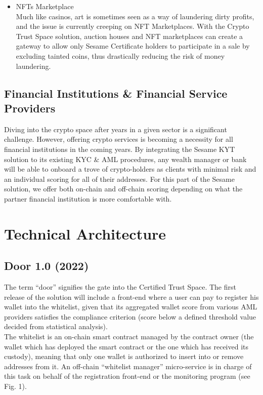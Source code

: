 ﻿\documentclass[a4paper]{article}
\newcommand{\smallvspace}{\vspace{4pt} \\}
\begin{document}
\begin{itemize}
\item 
NFTs Marketplace \smallvspace
Much like casinos, art is sometimes seen as a way of laundering dirty profits, and the issue is currently creeping on NFT Marketplaces. With the Crypto Trust Space solution, auction houses and NFT marketplaces can create a gateway to allow only Sesame Certificate holders to participate in a sale by excluding tainted coins, thus drastically reducing the risk of money laundering.
\end{itemize}

\subsection{Financial Institutions \& Financial Service Providers}
Diving into the crypto space after years in a given sector is a significant challenge. However, offering crypto services is becoming a necessity for all financial institutions in the coming years. By integrating the Sesame KYT solution to its existing KYC \& AML procedures, any wealth manager or bank will be able to onboard a trove of crypto-holders as clients with minimal risk and an individual scoring for all of their addresses. 
For this part of the Sesame solution, we offer both on-chain and off-chain scoring depending on what the partner financial institution is more comfortable with.

\newpage
\section{Technical Architecture}
\subsection{Door 1.0 (2022)}
The term “door” signifies the gate into the Certified Trust Space. The first release of the solution will include a front-end where a user can pay to register his wallet into the whitelist, given that its aggregated wallet score from various AML providers satisfies the compliance criterion (score below a defined threshold value decided from statistical analysis). \\

The whitelist is an on-chain smart contract managed by the contract owner (the wallet which has deployed the smart contract or the one which has received its custody), meaning that only one wallet is authorized to insert into or remove addresses from it. An off-chain “whitelist manager” micro-service is in charge of this task on behalf of the registration front-end or the monitoring program (see Fig. 1). \\
\end{document}
